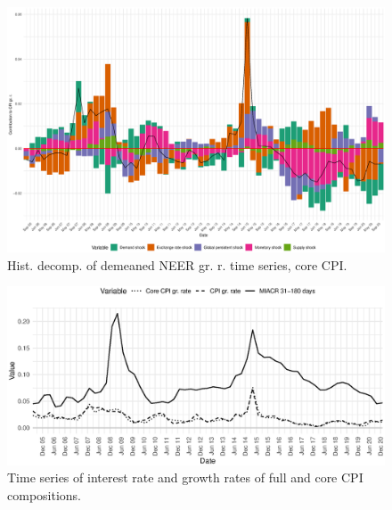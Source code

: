 \documentclass{beamer}
\begin{document}
\begin{frame}[noframenumbering]
	\label{corehd}
	\begin{figure}[h!]
		\centering
		\includegraphics[width=1\linewidth]{../Text/figures/hd_core_cpi_full}
		\caption[]{Hist. decomp. of demeaned NEER gr. r. time series, core CPI.}
		\label{fig:hd_cpi_core}
	\end{figure}
\end{frame}

\begin{frame}[noframenumbering]
	\label{intrate_cpi}
	\begin{figure}[h!]
		\centering
		\includegraphics[width=1\linewidth]{../Text/figures/intrate_cpi}
		\caption[]{Time series of interest rate and growth rates of full and core CPI compositions.}
		\label{fig:intrate_cpi}
	\end{figure}
\end{frame}
\end{document}
